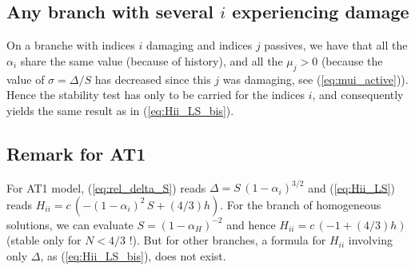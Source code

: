 \documentclass[final,3p,times,authoryear]{elsarticle}
\begin{document}
\subsection{Any branch with several $i$ experiencing damage}
On a branche with indices $i$ damaging and indices $j$ passives, we have that all the $\alpha_i$ share the same value (because of history), and all the $\mu_j>0$ (because the value of $\sigma=\Delta/S$ has decreased since this $j$ was damaging, see (\ref{eq:mui_active})). 
Hence the stability test has only to be carried for the indices $i$, and consequently yields the same result as in (\ref{eq:Hii_LS_bis}).

\subsection{Remark for AT1}
For AT1 model, (\ref{eq:rel_delta_S}) reads $\Delta = S \, (1-\alpha_i)^{3/2}$ and (\ref{eq:Hii_LS}) reads $H_{ii} = c \, (-(1-\alpha_i)^2 \, S + (4/3) h)$. 
For the branch of homogeneous solutions, we can evaluate $S=(1-\alpha_H)^{-2}$ and hence $H_{ii} = c \, (-1 + (4/3) h)$ (stable only for $N<4/3$ !).
But for other branches, a formula for $H_{ii}$ involving  only $\Delta$, as (\ref{eq:Hii_LS_bis}), does not exist.







%
%
%
%
%
%
%
%
%





\end{document}

